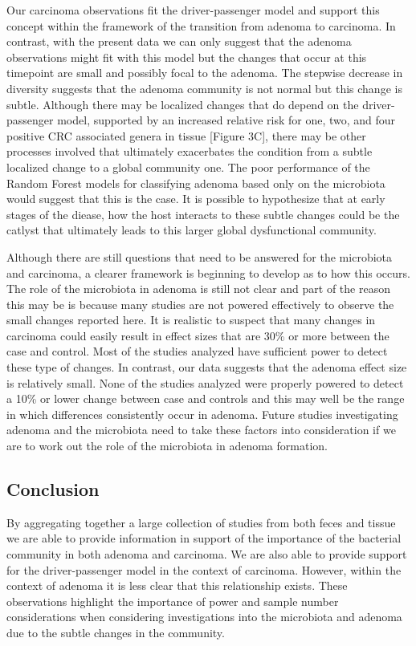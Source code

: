 \documentclass[12pt,]{article}
\begin{document}
Our carcinoma observations fit the driver-passenger model and support
this concept within the framework of the transition from adenoma to
carcinoma. In contrast, with the present data we can only suggest that
the adenoma observations might fit with this model but the changes that
occur at this timepoint are small and possibly focal to the adenoma. The
stepwise decrease in diversity suggests that the adenoma community is
not normal but this change is subtle. Although there may be localized
changes that do depend on the driver-passenger model, supported by an
increased relative risk for one, two, and four positive CRC associated
genera in tissue {[}Figure 3C{]}, there may be other processes involved
that ultimately exacerbates the condition from a subtle localized change
to a global community one. The poor performance of the Random Forest
models for classifying adenoma based only on the microbiota would
suggest that this is the case. It is possible to hypothesize that at
early stages of the diease, how the host interacts to these subtle
changes could be the catlyst that ultimately leads to this larger global
dysfunctional community.

Although there are still questions that need to be answered for the
microbiota and carcinoma, a clearer framework is beginning to develop as
to how this occurs. The role of the microbiota in adenoma is still not
clear and part of the reason this may be is because many studies are not
powered effectively to observe the small changes reported here. It is
realistic to suspect that many changes in carcinoma could easily result
in effect sizes that are 30\% or more between the case and control. Most
of the studies analyzed have sufficient power to detect these type of
changes. In contrast, our data suggests that the adenoma effect size is
relatively small. None of the studies analyzed were properly powered to
detect a 10\% or lower change between case and controls and this may
well be the range in which differences consistently occur in adenoma.
Future studies investigating adenoma and the microbiota need to take
these factors into consideration if we are to work out the role of the
microbiota in adenoma formation.

\subsection{Conclusion}\label{conclusion}

By aggregating together a large collection of studies from both feces
and tissue we are able to provide information in support of the
importance of the bacterial community in both adenoma and carcinoma. We
are also able to provide support for the driver-passenger model in the
context of carcinoma. However, within the context of adenoma it is less
clear that this relationship exists. These observations highlight the
importance of power and sample number considerations when considering
investigations into the microbiota and adenoma due to the subtle changes
in the community.
\end{document}
